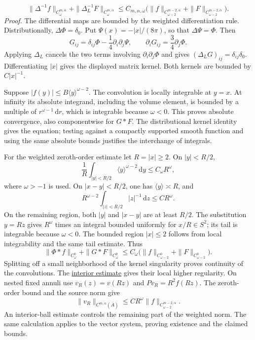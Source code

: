 \documentclass[
  english,
  11pt,
  reqno]{amsart}
\begin{document}
\label{eq:online-chart-decaying-inverse-bound} \[
\|\Delta^{-1}f\|_{C^{m,\alpha}_\omega}
+\|\Delta_L^{-1}F\|_{C^{m,\alpha}_\omega}
\le C_{m,\alpha,\omega}
\bigl(\|f\|_{C^{m-2,\alpha}_{\omega-2}}
+\|F\|_{C^{m-2,\alpha}_{\omega-2}}\bigr).
\] \emph{Proof.} The differential maps are bounded by the weighted
differentiation rule. Distributionally, \(\Delta\Phi=\delta_0\). Put
\(\Psi(x)=-|x|/(8\pi)\), so that \(\Delta\Psi=\Phi\). Then \[
G_{ij}=\delta_{ij}\Phi-\frac14\partial_i\partial_j\Psi,
\qquad
\partial_iG_{ij}=\frac34\partial_j\Phi.
\] Applying \(\Delta_L\) cancels the two terms involving
\(\partial_i\partial_j\Phi\) and gives
\((\Delta_LG)_{ij}=\delta_{ij}\delta_0\). Differentiating \(|x|\) gives
the displayed matrix kernel. Both kernels are bounded by \(C|x|^{-1}\).

Suppose \(|f(y)|\le B\langle y\rangle^{\omega-2}\). The convolution is
locally integrable at \(y=x\). At infinity its absolute integrand,
including the volume element, is bounded by a multiple of
\(r^{\omega-1}\,\mathrm dr\), which is integrable because \(\omega<0\).
This proves absolute convergence, also componentwise for \(G*F\). The
distributional kernel identity gives the equation; testing against a
compactly supported smooth function and using the same absolute bounds
justifies the interchange of integrals.

For the weighted zeroth-order estimate let \(R=|x|\ge2\). On
\(|y|<R/2\), \[
\frac1R\int_{|y|<R/2}
\langle y\rangle^{\omega-2}\,\mathrm dy
\le C_\omega R^\omega,
\] where \(\omega>-1\) is used. On \(|x-y|<R/2\), one has
\(\langle y\rangle\asymp R\), and \[
R^{\omega-2}\int_{|z|<R/2}|z|^{-1}\,\mathrm dz
\le C R^\omega.
\] On the remaining region, both \(|y|\) and \(|x-y|\) are at least
\(R/2\). The substitution \(y=Rz\) gives \(R^\omega\) times an integral
bounded uniformly for \(x/R\in S^2\); its tail is integrable because
\(\omega<0\). The bounded region \(|x|\le2\) follows from local
integrability and the same tail estimate. Thus \[
\|\Phi*f\|_{C^0_\omega}
+\|G*F\|_{C^0_\omega}
\le C_\omega
\bigl(\|f\|_{C^0_{\omega-2}}
+\|F\|_{C^0_{\omega-2}}\bigr).
\] Splitting off a small neighborhood of the kernel singularity proves
continuity of the convolutions. The
\hyperref[eq:online-chart-interior-schauder-input]{interior estimate}
gives their local higher regularity. On nested fixed annuli use
\(v_R(z)=v(Rz)\) and \(Pv_R=R^2f(Rz)\). The zeroth-order bound and the
source norm give \[
\|v_R\|_{C^{m,\alpha}(\overline A)}
\le C R^\omega
\|f\|_{C^{m-2,\alpha}_{\omega-2}}.
\] An interior-ball estimate controls the remaining part of the weighted
norm. The same calculation applies to the vector system, proving
existence and the claimed bounds.
\end{document}
